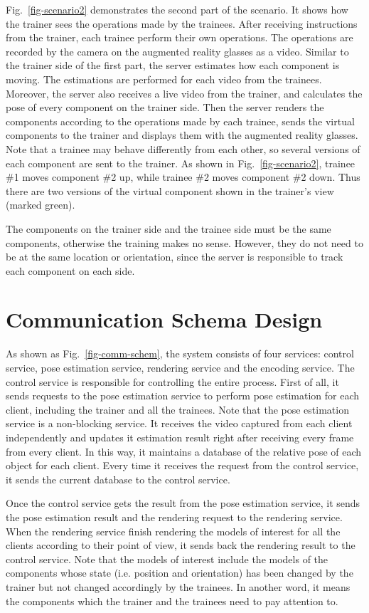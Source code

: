 Fig.~\ref{fig-scenario2} demonstrates the second part of the scenario. It shows how the trainer sees the operations made by the trainees.
After receiving instructions from the trainer, each trainee perform their own operations. The operations are recorded by the camera on the augmented reality glasses as a video.
Similar to the trainer side of the first part, the server estimates how each component is moving. The estimations are performed for each video from the trainees.
Moreover, the server also receives a live video from the trainer, and calculates the pose of every component on the trainer side.
Then the server renders the components according to the operations made by each trainee, sends the virtual components to the trainer and displays them with the augmented reality glasses.
Note that a trainee may behave differently from each other, so several versions of each component are sent to the trainer. As shown in Fig.~\ref{fig-scenario2}, trainee \#1 moves component \#2 up, while trainee \#2 moves component \#2 down. Thus there are two versions of the virtual component shown in the trainer's view (marked green).

The components on the trainer side and the trainee side must be the same components, otherwise the training makes no sense. However, they do not need to be at the same location or orientation, since the server is responsible to track each component on each side.

\section{Communication Schema Design}

As shown as Fig.~\ref{fig-comm-schem}, the system consists of four services: control service, pose estimation service, rendering service and the encoding service.
The control service is responsible for controlling the entire process.
First of all, it sends requests to the pose estimation service to perform pose estimation for each client, including the trainer and all the trainees.
Note that the pose estimation service is a non-blocking service. It receives the video captured from each client independently and updates it estimation result right after receiving every frame from every client. In this way, it maintains a database of the relative pose of each object for each client. Every time it receives the request from the control service, it sends the current database to the control service.

Once the control service gets the result from the pose estimation service, it sends the pose estimation result and the rendering request to the rendering service.
When the rendering service finish rendering the models of interest for all the clients according to their point of view, it sends back the rendering result to the control service.
Note that the models of interest include the models of the components whose state (i.e. position and orientation) has been changed by the trainer but not changed accordingly by the trainees. In another word, it means the components which the trainer and the trainees need to pay attention to.

